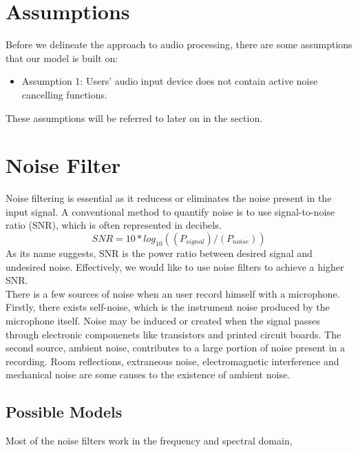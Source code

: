 \section{Assumptions}
Before we delineate the approach to audio processing, there are some assumptions that our model
is built on:
\begin{itemize}[label=\textbf{\arabic*})]
	\item{Assumption 1:} Users' audio input device does not contain active noise cancelling functions.
\end{itemize}

These assumptions will be referred to later on in the section.

\section{Noise Filter}
Noise filtering is essential as it reducess or eliminates the noise present in the input signal.
A conventional method to quantify noise is to use signal-to-noise ratio (SNR), which is often 
represented in decibels.
\[SNR=10*log_10((P_{signal})/(P_{noise}))\]
As its name suggests, SNR is the power ratio between desired signal and undesired noise. Effectively,
we would like to use noise filters to achieve a higher SNR.\\ 
There is a few sources of noise when an user record himself with a microphone.
Firstly, there exists self-noise, which is the instrument noise produced by the microphone itself.
Noise may be induced or created when the signal passes through electronic componenets like transistors 
and printed circuit boards.\cite{selfnoise} 
The second source, ambient noise, contributes to a large portion of noise present in a recording.
Room reflections, extraneous noise, electromagnetic interference and mechanical noise are some causes 
to the existence of ambient noise. 
\subsection{Possible Models}
Most of the noise filters work in the frequency and spectral domain, 

